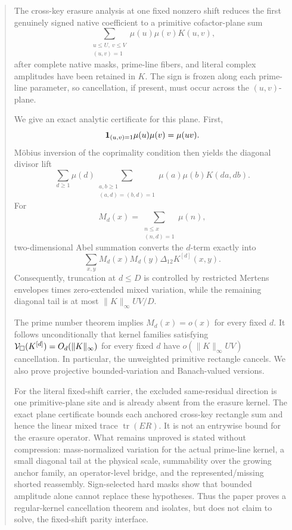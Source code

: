 \begin{abstract}
The cross-key erasure analysis at one fixed nonzero shift reduces the first
genuinely signed native coefficient to a primitive cofactor-plane sum
\[
 \sum_{\substack{u\le U,\ v\le V\\(u,v)=1}}
 \mu(u)\mu(v)K(u,v),
\]
after complete native masks, prime-line fibers, and literal complex
amplitudes have been retained in \(K\).  The sign is frozen along each
prime-line parameter, so cancellation, if present, must occur across the
\((u,v)\)-plane.

We give an exact analytic certificate for this plane.  First,
\[
 \one_{(u,v)=1}\mu(u)\mu(v)=\mu(uv).
\]
M\"obius inversion of the coprimality condition then yields the diagonal
divisor lift
\[
 \sum_{d\ge1}\mu(d)
 \sum_{\substack{a,b\ge1\\(a,d)=(b,d)=1}}
 \mu(a)\mu(b)K(da,db).
\]
For
\[
 M_d(x)=\sum_{\substack{n\le x\\(n,d)=1}}\mu(n),
\]
two-dimensional Abel summation converts the \(d\)-term exactly into
\[
 \sum_{x,y}M_d(x)M_d(y)
 \Delta_{12}K^{[d]}(x,y).
\]
Consequently, truncation at \(d\le D\) is controlled by restricted Mertens
envelopes times zero-extended mixed variation, while the remaining diagonal
tail is at most \(\|K\|_\infty UV/D\).

The prime number theorem implies \(M_d(x)=o(x)\) for every fixed \(d\).
It follows unconditionally that kernel families satisfying
\(\cV_\square(K^{[d]})=O_d(\|K\|_\infty)\) for every fixed \(d\)
have \(o(\|K\|_\infty UV)\) cancellation.  In particular, the unweighted
primitive rectangle cancels.
We also prove projective bounded-variation and Banach-valued versions.

For the literal fixed-shift carrier, the excluded same-residual direction
is one primitive-plane site and is already absent from the erasure kernel.
The exact plane certificate bounds each anchored
cross-key rectangle sum and hence the linear mixed trace
\(\operatorname{tr}(ER)\).  It is not an entrywise bound for the erasure
operator.  What remains unproved is stated without compression:
mass-normalized variation for the actual prime-line kernel, a small diagonal
tail at the physical scale, summability over the growing anchor family, an
operator-level bridge, and the represented/missing shorted reassembly.
Sign-selected hard masks show that bounded amplitude alone cannot replace
these hypotheses.  Thus the paper proves a regular-kernel cancellation
theorem and isolates, but does not claim to solve, the fixed-shift parity
interface.
\end{abstract}
